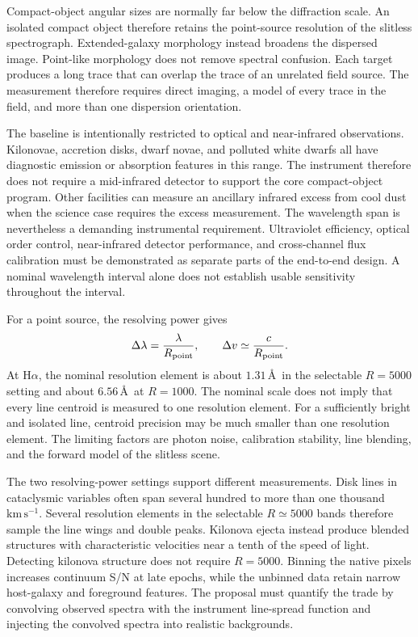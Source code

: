 \documentclass[10pt,onecolumn]{article}
\newcommand{\Rpoint}{R_{\rm point}}
\newcommand{\kms}{\mathrm{km\,s^{-1}}}
\begin{document}
Compact-object angular sizes are normally far below the diffraction scale.
An isolated compact object therefore retains the point-source resolution of
the slitless spectrograph. Extended-galaxy morphology instead broadens the
dispersed image. Point-like morphology does not remove spectral confusion.
Each target produces a long trace that can overlap the trace of an unrelated
field source. The measurement therefore requires direct imaging, a model of
every trace in the field, and more than one dispersion orientation.

The baseline is intentionally restricted to optical and near-infrared
observations. Kilonovae, accretion disks, dwarf novae, and polluted white
dwarfs all have diagnostic emission or absorption features in this range.
The instrument therefore does not require a mid-infrared detector to support
the core compact-object program. Other facilities can measure an ancillary
infrared excess from cool dust when the science case requires the excess
measurement.
The wavelength span is nevertheless a demanding instrumental requirement.
Ultraviolet efficiency, optical order control, near-infrared detector
performance, and cross-channel flux calibration must be demonstrated as
separate parts of the end-to-end design. A nominal wavelength interval alone
does not establish usable sensitivity throughout the interval.

For a point source, the resolving power gives
\begin{equation}
  \Delta\lambda = \frac{\lambda}{\Rpoint},
  \qquad
  \Delta v \simeq \frac{c}{\Rpoint}.
  \label{eq:resolution}
\end{equation}
At H$\alpha$, the nominal resolution element is about $1.31$\,\AA\ in the
selectable $R=5000$ setting and about $6.56$\,\AA\ at $R=1000$. The nominal
scale does not imply that every line centroid is measured to one resolution
element.
For a sufficiently bright and isolated line, centroid precision may be much
smaller than one resolution element. The limiting factors are photon noise,
calibration stability, line blending, and the forward model of the
slitless scene.

The two resolving-power settings support different measurements. Disk lines
in cataclysmic variables often span several hundred to more than one thousand
$\kms$. Several resolution elements in the selectable $R\simeq5000$ bands
therefore sample the line wings and double peaks. Kilonova ejecta instead
produce blended structures with characteristic velocities near a tenth of the
speed of light. Detecting kilonova structure does not require $R=5000$.
Binning the native pixels increases continuum S/N at late epochs, while the
unbinned data retain narrow host-galaxy and foreground features. The proposal
must quantify the trade by convolving observed spectra with the instrument
line-spread function and injecting the convolved spectra into realistic
backgrounds.
\end{document}
